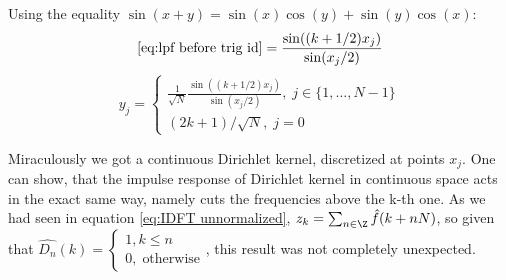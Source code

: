 Using the equality $\sin(x+y) = \sin(x)\cos(y) + \sin(y)\cos(x)$:
\[\eqref{eq:lpf before trig id} =\frac{\sin((k+1/2)x_j)}{\sin(x_j/2)}\]
\[y_j = \begin{cases}
		\frac{1}{\sqrt{N}}\frac{\sin((k+1/2)x_j)}{\sin(x_j/2)}, \;  j\in \{1, \dots, N-1\} \\
		(2k+1)/\sqrt{N}, \; j = 0
	\end{cases}\]

Miraculously we got a continuous Dirichlet kernel, discretized at points $x_j$. One can show, that the impulse response of Dirichlet kernel in continuous space acts in the exact same way, namely cuts the frequencies above the k-th one. As we had seen in equation \eqref{eq:IDFT unnormalized}, $z_k = \sum_{n \in \Z} \hat{f}(k+nN)$, so given that $\widehat{D_n}(k) = \begin{cases}
		1, k \leq n \\
		0, \; \text{otherwise}
	\end{cases}$, this result was not completely unexpected.